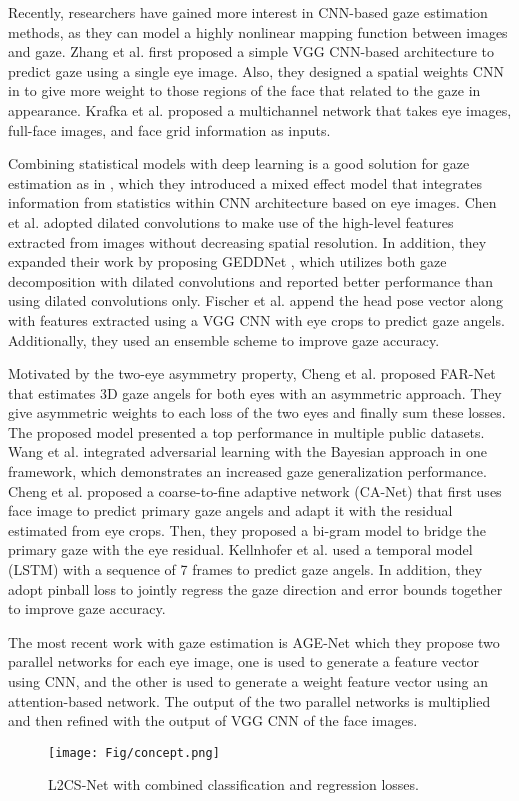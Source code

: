 \documentclass{article}
\begin{document}
Recently, researchers have gained more interest in CNN-based gaze estimation methods, as they can model a highly nonlinear mapping function between images and gaze. Zhang et al. \cite{Mpiigaze} first proposed a simple VGG CNN-based architecture to predict gaze using a single eye image. Also, they designed a spatial weights CNN in \cite{Mpiigaze1} to give more weight to those regions of the face that related to the gaze in appearance. Krafka et al. \cite{itracker} proposed a multichannel network that takes eye images, full-face images, and face grid information as inputs.

Combining statistical models with deep learning is a good solution for gaze estimation as in \cite{MeNets}, which they introduced a mixed effect model that integrates information from statistics within CNN architecture based on eye images. Chen et al. \cite{dilated} adopted dilated convolutions to make use of the high-level features extracted from images without decreasing spatial resolution. In addition, they expanded their work by proposing GEDDNet \cite{GEDDNet}, which utilizes both gaze decomposition with dilated convolutions and reported better performance than using dilated convolutions only. Fischer et al. \cite{rtgene} append the head pose vector along with features extracted using a VGG CNN with eye crops to predict gaze angels. Additionally, they used an ensemble scheme to improve gaze accuracy.

Motivated by the two-eye asymmetry property, Cheng et al. \cite{farenet} proposed FAR-Net that estimates 3D gaze angels for both eyes with an asymmetric approach. They give asymmetric weights to each loss of the two eyes and finally sum these losses. The proposed model presented a top performance in multiple public datasets. Wang et al. \cite{BayesianApproach} integrated adversarial learning with the Bayesian approach in one framework, which demonstrates an increased gaze generalization performance. Cheng et al. \cite{ca-net} proposed a coarse-to-fine adaptive network (CA-Net) that first uses face image to predict primary gaze angels and adapt it with the residual estimated from eye crops. Then, they proposed a bi-gram model to bridge the primary gaze with the eye residual. Kellnhofer et al. \cite{Gaze360} used a temporal model (LSTM) with a sequence of 7 frames to predict gaze angels. In addition, they adopt pinball loss to jointly regress the gaze direction and error bounds together to improve gaze accuracy.

The most recent work with gaze estimation is AGE-Net \cite{cvpr2021} which they propose two parallel networks for each eye image, one is used to generate a feature vector using CNN, and the other is used to generate a weight feature vector using an attention-based network. The output of the two parallel networks is multiplied and then refined with the output of VGG CNN of the face images.
\begin{figure*}
  \texttt{[image: Fig/concept.png]}
  \caption{L2CS-Net with combined classification and regression losses.}
\label{fig:concept}
\end{figure*}
\end{document}

